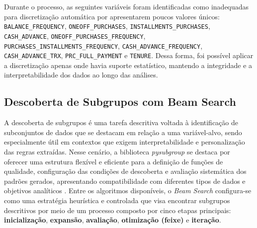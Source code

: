 \documentclass[12pt]{article}
\begin{document}
Durante o processo, as seguintes variáveis foram identificadas como inadequadas para discretização automática por apresentarem poucos valores únicos: \texttt{BALANCE\_FREQUENCY}, \texttt{ONEOFF\_PURCHASES}, \texttt{INSTALLMENTS\_PURCHASES}, \texttt{CASH\_ADVANCE}, \texttt{ONEOFF\_PURCHASES\_FREQUENCY}, \texttt{PURCHASES\_INSTALLMENTS\_FREQUENCY}, \texttt{CASH\_ADVANCE\_FREQUENCY}, \texttt{CASH\_ADVANCE\_TRX}, \texttt{PRC\_FULL\_PAYMENT} e \texttt{TENURE}. Dessa forma, foi possível aplicar a discretização apenas onde havia suporte estatístico, mantendo a integridade e a interpretabilidade dos dados ao longo das análises.


\subsection{Descoberta de Subgrupos com Beam Search}

\hspace{1.2cm}A descoberta de subgrupos é uma tarefa descritiva voltada à identificação de subconjuntos de dados que se destacam em relação a uma variável-alvo, sendo especialmente útil em contextos que exigem interpretabilidade e personalização das regras extraídas. Nesse cenário, a biblioteca \textit{pysubgroup} se destaca por oferecer uma estrutura flexível e eficiente para a definição de funções de qualidade, configuração das condições de descoberta e avaliação sistemática dos padrões gerados, apresentando compatibilidade com diferentes tipos de dados e objetivos analíticos \cite{lemmerich:18}. Entre os algoritmos disponíveis, o \textit{Beam Search} configura-se como uma estratégia heurística e controlada que visa encontrar subgrupos descritivos por meio de um processo composto por cinco etapas principais: \textbf{inicialização}, \textbf{expansão}, \textbf{avaliação}, \textbf{otimização (feixe)} e \textbf{iteração}.
\end{document}
